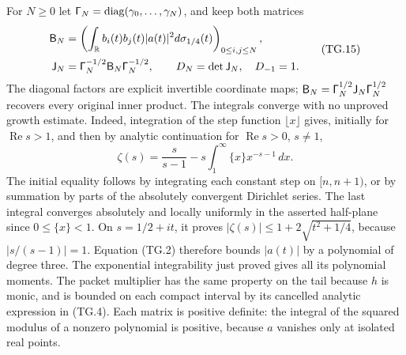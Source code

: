 For \(N\geq0\) let \(\mathord{\text{\fontencoding{OT1}\fontfamily{cmss}\selectfont\char0}}_N=\operatorname{diag}
(\gamma_0,\ldots,\gamma_N)\), and keep both matrices
\[
 \begin{aligned}
 \mathsf B_N&=\left(\int_{\mathbb R}
              b_i(t)b_j(t)|a(t)|^2d\sigma_{1/4}(t)\right)_{0\leq i,j\leq N},\\
 \mathsf J_N&=\mathord{\text{\fontencoding{OT1}\fontfamily{cmss}\selectfont\char0}}_N^{-1/2}\mathsf B_N
                       \mathord{\text{\fontencoding{OT1}\fontfamily{cmss}\selectfont\char0}}_N^{-1/2},\qquad
 D_N=\det\mathsf J_N,\quad D_{-1}=1.
 \end{aligned}                                                    \tag{TG.15}
\]
The diagonal factors are explicit invertible coordinate maps;
\(\mathsf B_N=\mathord{\text{\fontencoding{OT1}\fontfamily{cmss}\selectfont\char0}}_N^{1/2}\mathsf J_N
\mathord{\text{\fontencoding{OT1}\fontfamily{cmss}\selectfont\char0}}_N^{1/2}\) recovers every original inner product.
The integrals converge with no unproved growth estimate.  Indeed,
integration of the step function \(\lfloor x\rfloor\) gives,
initially for \(\operatorname{Re}s>1\), and then by analytic
continuation for \(\operatorname{Re}s>0\), \(s\ne1\),
\[
 \zeta(s)=\frac{s}{s-1}
         -s\int_1^\infty\{x\}x^{-s-1}\,dx.
\]
The initial equality follows by integrating each constant step on
\([n,n+1)\), or by summation by parts of the absolutely convergent
Dirichlet series.  The last integral converges absolutely and
locally uniformly in the asserted half-plane since \(0\leq\{x\}<1\).
On \(s=1/2+it\), it proves
\( |\zeta(s)|\leq1+2\sqrt{t^2+1/4}\), because
\(|s/(s-1)|=1\).  Equation (TG.2) therefore bounds \(|a(t)|\)
by a polynomial of degree three.  The exponential integrability
just proved gives all its polynomial moments.  The packet
multiplier has the same property on the tail because \(h\) is
monic, and is bounded on each compact interval by its cancelled
analytic expression in (TG.4).
Each matrix is positive definite:
the integral of the squared modulus of a nonzero polynomial is
positive, because \(a\) vanishes only at isolated real points.

